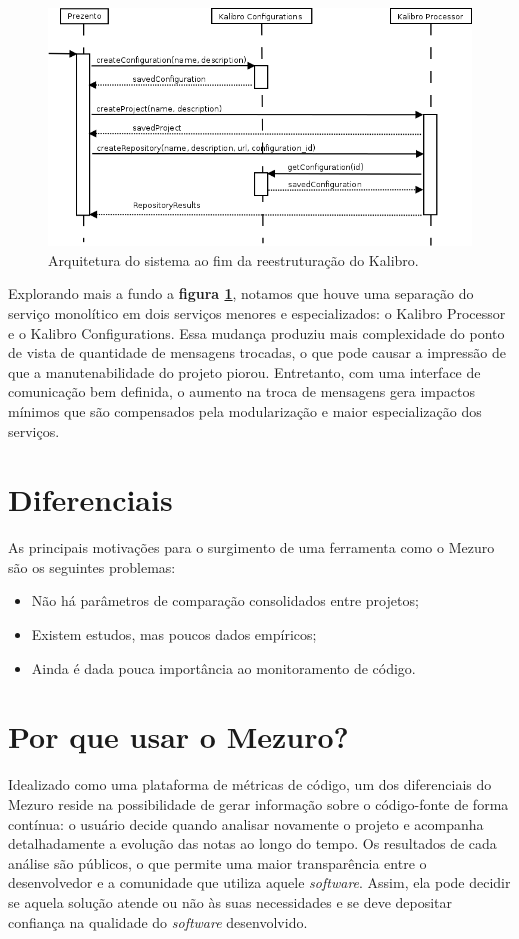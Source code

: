 \documentclass{llncs}
\begin{document}
  \begin{figure}[H]
    \centering
      \includegraphics[width=\textwidth]{images/processing_seq_diag.png}
    \caption{Arquitetura do sistema ao fim da reestruturação do Kalibro.}
    \label{fig:architecture-2}
  \end{figure}

  Explorando mais a fundo a \textbf{figura \ref{fig:architecture-2}}, notamos que houve uma separação do serviço monolítico em dois serviços menores e especializados: o Kalibro Processor e o Kalibro Configurations. Essa mudança produziu mais complexidade do ponto de vista de quantidade de mensagens trocadas, o que pode causar a impressão de que a manutenabilidade do projeto piorou. Entretanto, com uma interface de comunicação bem definida, o aumento na troca de mensagens gera impactos mínimos que são compensados pela modularização e maior especialização dos serviços.

\section{Diferenciais} \label{subsec:motivacao}
As principais motivações para o surgimento de uma ferramenta como o Mezuro são os seguintes problemas:
\begin{itemize}
    \item Não há parâmetros de comparação consolidados entre projetos;
    \item Existem estudos, mas poucos dados empíricos;
    \item Ainda é dada pouca importância ao monitoramento de código.
\end{itemize}

\section{Por que usar o Mezuro?} \label{sec:projeto-mezuro}
Idealizado como uma plataforma de métricas de código, um dos diferenciais do Mezuro reside na possibilidade de gerar informação sobre o código-fonte de forma contínua: o usuário decide quando analisar novamente o projeto e acompanha detalhadamente a evolução das notas ao longo do tempo. Os resultados de cada análise são públicos, o que permite uma maior transparência entre o desenvolvedor e a comunidade que utiliza aquele \textit{software}. Assim, ela pode decidir se aquela solução atende ou não às suas necessidades e se deve depositar confiança na qualidade do \textit{software} desenvolvido.
\end{document}
